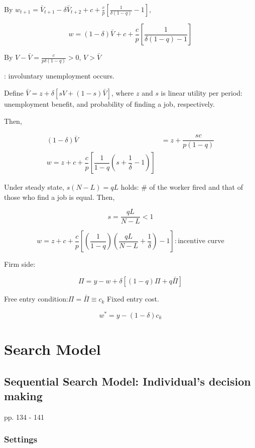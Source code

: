 \documentclass[dvipdfmx, 12pt]{article}
\begin{document}
By $w_{t + 1} = \bar{V}_{t + 1} - \delta \bar{V}_{t+2} + c + \frac{c}{p} \left[ \frac{1}{\delta (1 - q)} - 1 \right]$,

\[
w = (1 - \delta) \bar{V} + c + \dfrac{c}{p} \left[ \dfrac{1}{\delta (1 - q) - 1} \right]
\]

By $V - \bar{V} = \frac{c}{p \delta (1 - q)} > 0$, $V > \bar{V}$

: involuntary unemployment occurs.

Define $\bar{V} = z + \delta [sV + (1 - s) \bar{V}]$, where $z$ and $s$ is linear utility per period: unemployment benefit, and probability of finding a job, respectively.

Then,

\begin{align*}
  (1 - \delta) \bar{V} &= z + \dfrac{sc}{p (1 - q)} \\
  w = z + c + \dfrac{c}{p} \left[ \dfrac{1}{1 - q} \left( s + \dfrac{1}{\delta} - 1 \right) \right]
\end{align*}

Under steady state, $s(N-L) = qL$ holds: \# of the worker fired and that of those who find a job is equal. Then,

\[
s = \dfrac{q L}{N - L} < 1
\]


\[
w = z + c + \dfrac{c}{p} \left[\left( \dfrac{1}{1-q} \right) \left(\dfrac{qL}{N - L} + \dfrac{1}{\delta} \right) - 1 \right] : \text{incentive curve}
\]

Firm side:

\[
\Pi = y - w + \delta [(1 - q) \Pi + q \bar{\Pi}]
\]

Free entry condition:$\Pi = \bar{\Pi} \equiv c_k$ Fixed entry cost.

\[
w^* = y -(1 - \delta)c_k
\]

\section{Search Model}

\subsection{Sequential Search Model: Individual's decision making}
pp. 134 - 141

\subsubsection{Settings}
\end{document}
